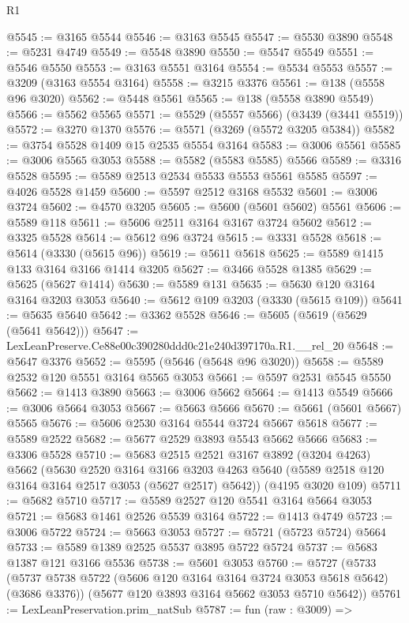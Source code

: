\begin{lexlean}{R1}
\begin{coremodule}
@5545 := @3165 @5544
@5546 := @3163 @5545
@5547 := @5530 @3890
@5548 := @5231 @4749
@5549 := @5548 @3890
@5550 := @5547 @5549
@5551 := @5546 @5550
@5553 := @3163 @5551 @3164
@5554 := @5534 @5553
@5557 := @3209 (@3163 @5554 @3164)
@5558 := @3215 @3376
@5561 := @138 (@5558 @96 @3020)
@5562 := @5448 @5561
@5565 := @138 (@5558 @3890 @5549)
@5566 := @5562 @5565
@5571 := @5529 (@5557 @5566) (@3439 (@3441 @5519))
@5572 := @3270 @1370
@5576 := @5571 (@3269 (@5572 @3205 @5384))
@5582 := @3754 @5528 @1409 @15 @2535 @5554 @3164
@5583 := @3006 @5561
@5585 := @3006 @5565 @3053
@5588 := @5582 (@5583 @5585) @5566
@5589 := @3316 @5528
@5595 := @5589 @2513 @2534 @5533 @5553 @5561 @5585
@5597 := @4026 @5528 @1459
@5600 := @5597 @2512 @3168 @5532
@5601 := @3006 @3724
@5602 := @4570 @3205
@5605 := @5600 (@5601 @5602) @5561
@5606 := @5589 @118
@5611 := @5606 @2511 @3164 @3167 @3724 @5602
@5612 := @3325 @5528
@5614 := @5612 @96 @3724
@5615 := @3331 @5528
@5618 := @5614 (@3330 (@5615 @96))
@5619 := @5611 @5618
@5625 := @5589 @1415 @133 @3164 @3166 @1414 @3205
@5627 := @3466 @5528 @1385
@5629 := @5625 (@5627 @1414)
@5630 := @5589 @131
@5635 := @5630 @120 @3164 @3164 @3203 @3053
@5640 := @5612 @109 @3203 (@3330 (@5615 @109))
@5641 := @5635 @5640
@5642 := @3362 @5528
@5646 := @5605 (@5619 (@5629 (@5641 @5642)))
@5647 := LexLeanPreserve.Ce88e00c390280ddd0c21e240d397170a.R1.__rel_20
@5648 := @5647 @3376
@5652 := @5595 (@5646 (@5648 @96 @3020))
@5658 := @5589 @2532 @120 @5551 @3164 @5565 @3053
@5661 := @5597 @2531 @5545 @5550
@5662 := @1413 @3890
@5663 := @3006 @5662
@5664 := @1413 @5549
@5666 := @3006 @5664 @3053
@5667 := @5663 @5666
@5670 := @5661 (@5601 @5667) @5565
@5676 := @5606 @2530 @3164 @5544 @3724 @5667 @5618
@5677 := @5589 @2522
@5682 := @5677 @2529 @3893 @5543 @5662 @5666
@5683 := @3306 @5528
@5710 := @5683
    @2515
    @2521
    @3167
    @3892
    (@3204 @4263)
    @5662
    (@5630
      @2520
      @3164
      @3166
      @3203
      @4263
      @5640
      (@5589 @2518 @120 @3164 @3164 @2517 @3053 (@5627 @2517) @5642))
    (@4195 @3020 @109)
@5711 := @5682 @5710
@5717 := @5589 @2527 @120 @5541 @3164 @5664 @3053
@5721 := @5683 @1461 @2526 @5539 @3164
@5722 := @1413 @4749
@5723 := @3006 @5722
@5724 := @5663 @3053
@5727 := @5721 (@5723 @5724) @5664
@5733 := @5589 @1389 @2525 @5537 @3895 @5722 @5724
@5737 := @5683 @1387 @121 @3166 @5536
@5738 := @5601 @3053
@5760 := @5727
    (@5733
      (@5737 @5738 @5722 (@5606 @120 @3164 @3164 @3724 @3053 @5618 @5642) (@3686 @3376))
      (@5677 @120 @3893 @3164 @5662 @3053 @5710 @5642))
@5761 := LexLeanPreservation.prim_natSub
@5787 := fun (raw : @3009) =>

\end{coremodule}
\end{lexlean}
